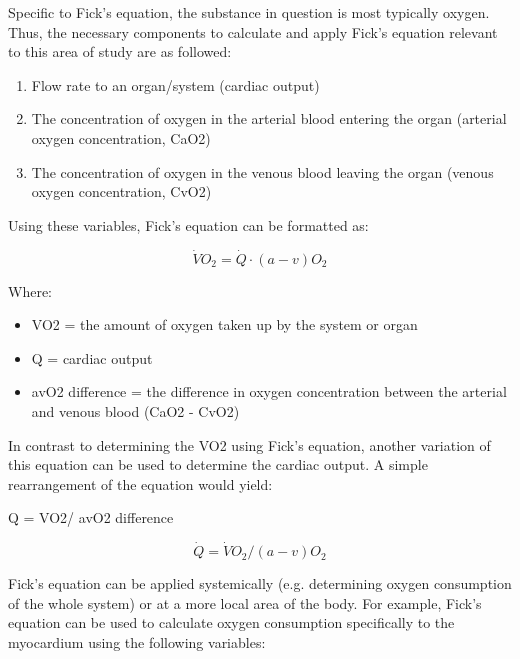 Specific to Fick’s equation, the substance in question is most typically oxygen. Thus, the necessary components to calculate and apply Fick’s equation relevant to this area of study are as followed:

\begin{enumerate}
    \item Flow rate to an organ/system (cardiac output)
    \item The concentration of oxygen in the arterial blood entering the organ (arterial oxygen concentration, CaO2)
    \item The concentration  of oxygen in the venous blood leaving the organ (venous oxygen concentration, CvO2)
\end{enumerate}

Using these variables, Fick’s equation can be formatted as:

\begin{equation}
    \dot{V}O_2 = \dot{Q} \cdot (a-v)O_2
\end{equation}

Where: 

\begin{itemize}
    \item VO2 = the amount of oxygen taken up by the system or organ
\end{itemize}
\begin{itemize}
    \item Q = cardiac output
\end{itemize}
\begin{itemize}
    \item avO2 difference = the difference in oxygen concentration between the arterial and venous blood (CaO2 - CvO2)
\end{itemize}

In contrast to determining the VO2 using Fick’s equation, another variation of this equation can be used to determine the cardiac output. A simple rearrangement of the equation would yield:

Q = VO2/ avO2 difference 

\begin{equation}
    \dot{Q} = \dot{V}O_2 / (a-v)O_2
\end{equation}

Fick’s equation can be applied systemically (e.g. determining oxygen consumption of the whole system) or at a more local area of the body. For example, Fick’s equation can be used to calculate oxygen consumption specifically to the myocardium using the following variables: 

